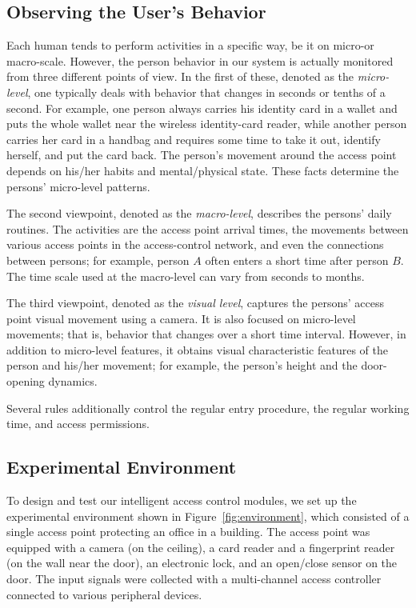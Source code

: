 \subsection{Observing the User's Behavior}
\label{sec:system:behavior}

Each human tends to perform activities in a specific way, be it on micro-or macro-scale. However, the person behavior in our system is actually monitored from three different points of view. In the first of these, denoted as the \textit{micro-level}, one typically deals with behavior that changes in seconds or tenths of a second. For example, one person always carries his identity card in a wallet and puts the whole wallet near the wireless identity-card reader, while another person carries her card in a handbag and requires some time to take it out, identify herself, and put the card back. The person's movement around the access point depends on his/her habits and mental/physical state. These facts determine the persons' micro-level patterns.

The second viewpoint, denoted as the \textit{macro-level}, describes the persons' daily routines. The activities are the access point arrival times, the movements between various access points in the access-control network, and even the connections between persons; for example, person $A$ often enters a short time after person $B$. The time scale used at the macro-level can vary from seconds to months.

The third viewpoint, denoted as the \textit{visual level}, captures the persons' access point visual movement using a camera. It is also focused on micro-level movements; that is, behavior that changes over a short time interval. However,  in addition to micro-level features, it obtains visual characteristic features of the person and his/her movement; for example, the person's height and the door-opening dynamics.

Several rules additionally control the regular entry procedure, the regular working time, and access permissions.


\subsection{Experimental Environment}
\label{sec:system:experimental}

To design and test our intelligent access control modules, we set up the experimental environment shown in Figure~\ref{fig:environment}, which consisted of a single access point protecting an office in a building. The access point was equipped with a camera (on the ceiling), a card reader and a fingerprint reader (on the wall near the door), an electronic lock, and an open/close sensor on the door. The input signals were collected with a multi-channel access controller connected to various peripheral devices. 

